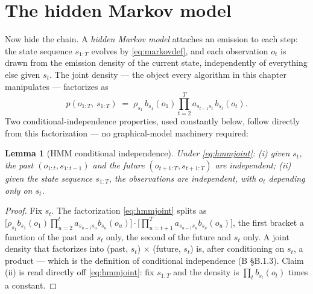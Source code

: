 \documentclass[11pt]{article}
\numberwithin{equation}{section}
\theoremstyle{plain}
\newtheorem{lemma}[theorem]{Lemma}
\theoremstyle{definition}
\theoremstyle{remark}
\begin{document}
\section{The hidden Markov model}\label{sec:hmm}

Now hide the chain. A \emph{hidden Markov model} attaches an emission to each step: the state sequence $s_{1:T}$ evolves by \eqref{eq:markovdef}, and each observation $o_t$ is drawn from the emission density of the current state, independently of everything else given $s_t$. The joint density --- the object every algorithm in this chapter manipulates --- factorizes as
\begin{equation}
p(o_{1:T},\, s_{1:T})
\;=\; \rho_{s_1}\, b_{s_1}(o_1) \prod_{t=2}^{T} a_{s_{t-1} s_t}\, b_{s_t}(o_t).
\label{eq:hmmjoint}
\end{equation}
Two conditional-independence properties, used constantly below, follow directly from this factorization --- no graphical-model machinery required:

\begin{lemma}[HMM conditional independence]\label{lem:hmmci}
Under \eqref{eq:hmmjoint}: (i) given $s_t$, the past $(o_{1:t}, s_{1:t-1})$ and the future $(o_{t+1:T}, s_{t+1:T})$ are independent; (ii) given the state sequence $s_{1:T}$, the observations are independent, with $o_t$ depending only on $s_t$.
\end{lemma}
\begin{proof}
Fix $s_t$. The factorization \eqref{eq:hmmjoint} splits as $\big[\rho_{s_1} b_{s_1}(o_1)\prod_{u=2}^{t} a_{s_{u-1}s_u} b_{s_u}(o_u)\big] \cdot \big[\prod_{u=t+1}^{T} a_{s_{u-1}s_u} b_{s_u}(o_u)\big]$, the first bracket a function of the past and $s_t$ only, the second of the future and $s_t$ only. A joint density that factorizes into (past, $s_t$) $\times$ (future, $s_t$) is, after conditioning on $s_t$, a product --- which is the definition of conditional independence (B \S B.1.3). Claim (ii) is read directly off \eqref{eq:hmmjoint}: fix $s_{1:T}$ and the density is $\prod_t b_{s_t}(o_t)$ times a constant.
\end{proof}
\end{document}

